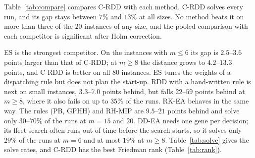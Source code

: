 Table~\ref{tab:compare} compares C-RDD with each method.
C-RDD solves every run, and its gap stays between $7\%$ and $13\%$ at all sizes.
No method beats it on more than three of the $20$ instances of any size, and the pooled comparison with each competitor is significant after Holm correction.

ES is the strongest competitor.
On the instances with $m \le 6$ its gap is $2.5$--$3.6$ points larger than that of C-RDD; at $m \ge 8$ the distance grows to $4.2$--$13.3$ points, and C-RDD is better on all $80$ instances.
ES tunes the weights of a dispatching rule but does not plan the start-up.
RDD with a hand-written rule is next on small instances, $3.3$--$7.0$ points behind, but falls $22$--$59$ points behind at $m \ge 8$, where it also fails on up to $35\%$ of the runs.
RK-EA behaves in the same way.
The rules (PB, GPHH) and RH-MIP are $9.5$--$21$ points behind and solve only $30$--$70\%$ of the runs at $m = 15$ and $20$.
DD-EA needs one gene per decision; its fleet search often runs out of time before the search starts, so it solves only $29\%$ of the runs at $m = 6$ and at most $19\%$ at $m \ge 8$.
Table~\ref{tab:solve} gives the solve rates, and C-RDD has the best Friedman rank (Table~\ref{tab:rank}).


